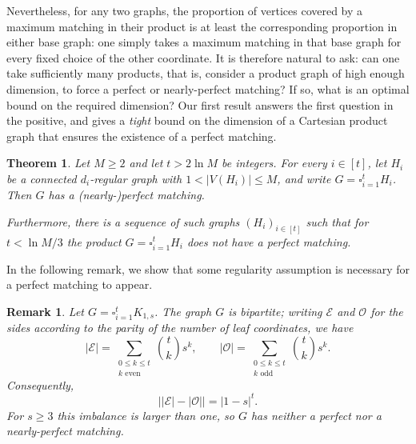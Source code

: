 \documentclass[10pt,a4paper]{article}
\newtheorem{theorem}{Theorem}
\newtheorem{remark}[thm]{Remark}
\newcommand{\cO}{\mathcal{O}}
\newcommand{\cE}{\mathcal{E}}
\begin{document}
Nevertheless, for any two graphs, the proportion of vertices covered by a maximum matching in their product is at least the corresponding proportion in either base graph: one simply takes a maximum matching in that base graph for every fixed choice of the other coordinate. It is therefore natural to ask: can one take sufficiently many products, that is, consider a product graph of high enough dimension, to force a perfect or nearly-perfect matching? If so, what is an optimal bound on the required dimension? Our first result answers the first question in the positive, and gives a \textit{tight} bound on the dimension of a Cartesian product graph that ensures the existence of a perfect matching.

\begin{theorem}\label{th:deterministic}
Let $M\ge2$ and let $t>2 \ln M$ be integers. For every $i\in[t]$, let $H_i$ be a connected $d_i$-regular graph with $1<|V(H_i)|\le M$, and write $G=\square_{i=1}^t H_i$. Then $G$ has a (nearly-)perfect matching.

Furthermore, there is a sequence of such graphs $(H_i)_{i \in [t]}$ such that for $t<\ln M/3$ the product $G=\square_{i=1}^t H_i$ does not have a perfect matching.
\end{theorem}


In the following remark, we show that some regularity assumption is necessary for a perfect matching to appear. 

\begin{remark}\label{rem:stars}
Let $G=\square_{i=1}^tK_{1,s}$.
The graph $G$ is bipartite; writing $\cE$ and $\cO$ for the sides according to the parity of the number of leaf coordinates, we have
\[
  |\cE|=\sum_{\substack{0\le k\le t\\k\text{ even}}}\binom{t}{k}s^k,
  \qquad
  |\cO|=\sum_{\substack{0\le k\le t\\k\text{ odd}}}\binom{t}{k}s^k.
\]
Consequently,
\[
  \bigl||\cE|-|\cO|\bigr|=|1-s|^t.
\]
For $s\ge3$ this imbalance is larger than one, so $G$ has neither a perfect nor a nearly-perfect matching.
\end{remark}
\end{document}
